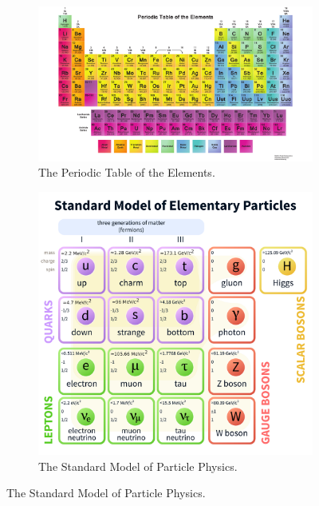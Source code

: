 \begin{figure}[hbp!]
\centering
\begin{subfigure}[c]{0.55\textwidth}
\includegraphics[width=\textwidth]{figs/PeriodicTable.pdf}
\caption{The Periodic Table of the Elements.}
\end{subfigure}
\begin{subfigure}[c]{0.4\textwidth}
\includegraphics[width=\textwidth]{figs/StandardModelofElementaryParticles.pdf}
\caption{The Standard Model of Particle Physics.}
\label{fig:sm}
\end{subfigure}
\end{figure}

